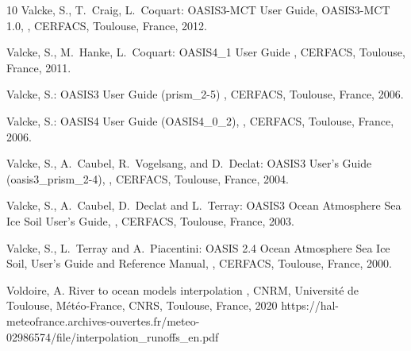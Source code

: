 \begin{thebibliography}{10}
Valcke, S., T.~Craig, L.~Coquart:
\newblock OASIS3-MCT User Guide, OASIS3-MCT 1.0,
,
\newblock CERFACS, Toulouse, France, 2012.

Valcke, S., M.~Hanke, L.~Coquart:
\newblock OASIS4\_1 User Guide
,
\newblock CERFACS, Toulouse, France, 2011.

Valcke, S.:
\newblock OASIS3 User Guide (prism\_2-5)
,
\newblock CERFACS, Toulouse, France, 2006.

Valcke, S.:
\newblock OASIS4 User Guide (OASIS4\_0\_2),
,
\newblock CERFACS, Toulouse, France, 2006.

Valcke, S., A.~Caubel, R.~Vogelsang, and D.~Declat:
\newblock OASIS3 User's Guide (oasis3\_prism\_2-4),
,
\newblock CERFACS, Toulouse, France, 2004.

Valcke, S., A.~Caubel, D.~Declat and L.~Terray:
\newblock OASIS3 Ocean Atmosphere Sea Ice Soil User's Guide,
,
\newblock CERFACS, Toulouse, France, 2003.

Valcke, S., L.~Terray and A.~Piacentini:
\newblock OASIS 2.4 Ocean Atmosphere Sea Ice Soil, User's Guide and
Reference Manual,
,
\newblock CERFACS, Toulouse, France, 2000.

Voldoire, A. 
\newblock River to ocean models interpolation
,
\newblock CNRM, Universit{\'e} de Toulouse, M{\'e}t{\'e}o-France,
CNRS, Toulouse, France, 2020
\newblock https://hal-meteofrance.archives-ouvertes.fr/meteo-02986574/file/interpolation\_runoffs\_en.pdf

\end{thebibliography}
